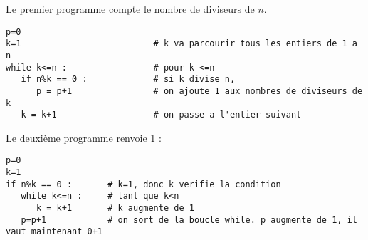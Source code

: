\begin{solution}
Le premier programme compte le nombre de diviseurs de $n$.
\begin{verbatim}
p=0
k=1                          # k va parcourir tous les entiers de 1 a n
while k<=n :                 # pour k <=n     
   if n%k == 0 :             # si k divise n,
      p = p+1                # on ajoute 1 aux nombres de diviseurs de k
   k = k+1                   # on passe a l'entier suivant 
\end{verbatim}
Le deuxième programme renvoie 1 :
\begin{verbatim}
p=0
k=1
if n%k == 0 :       # k=1, donc k verifie la condition
   while k<=n :     # tant que k<n
      k = k+1       # k augmente de 1
   p=p+1            # on sort de la boucle while. p augmente de 1, il vaut maintenant 0+1
\end{verbatim}
\end{solution}
\bigskip

